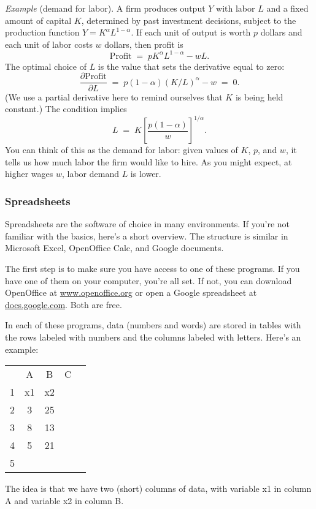 \documentclass[letterpaper,12pt]{article}
\begin{document}
{\it Example} (demand for labor).
A firm produces output $Y$ with labor $L$ and a fixed amount of capital $K$,
determined by past investment decisions,
subject to the production function $ Y = K^\alpha L^{1-\alpha} $.
If each unit of output is worth $p$ dollars and each unit of labor costs $w$ dollars,
then profit is
\[
    \mbox{Profit} \;=\; p K^\alpha L^{1-\alpha} - w L .
\]
The optimal choice of $L$ is the value that sets the derivative equal to zero:
\[
    \frac{\partial \mbox{Profit}}{\partial L} \;=\;  p (1-\alpha) (K/L)^\alpha - w \;=\; 0 .
\]
(We use a partial derivative here to remind ourselves that $K$ is being held constant.)
The condition implies
\[
    L \;=\; K \left[ \frac{p (1-\alpha)}{w} \right]^{1/\alpha} .
\]
You can think of this as the demand for labor:
given values of $K$, $p$, and $w$, it tells us how much labor the firm would like to hire.
As you might expect, at higher wages $w$, labor demand $L$ is lower.


\subsubsection*{Spreadsheets}

Spreadsheets are the software of choice in many environments.
If you're not familiar with the basics, here's a short overview.
The structure is similar in
Microsoft Excel, OpenOffice Calc, and Google documents.

The first step is to make sure you have access to one of these programs.
If you have one of them on your computer, you're all set.
If not, you can download OpenOffice at
\url{www.openoffice.org} or open a Google spreadsheet
at \url{docs.google.com}.
Both are free.

In each of these programs,
data (numbers and words) are stored in tables
with the rows labeled with numbers
and the columns labeled with letters.
Here's an example:
%
\begin{center}
\begin{tabular}{ccccc}
    &  A  &  B   &  C  \\
1   &  x1 &  x2        \\
2   &  3  &  25        \\
3   &  8  &  13        \\
4   &  5  &  21        \\
5    %
\end{tabular}
\end{center}
%
The idea is that we have two (short) columns of data,
with variable x1 in column A and variable x2 in column B.
\end{document}
